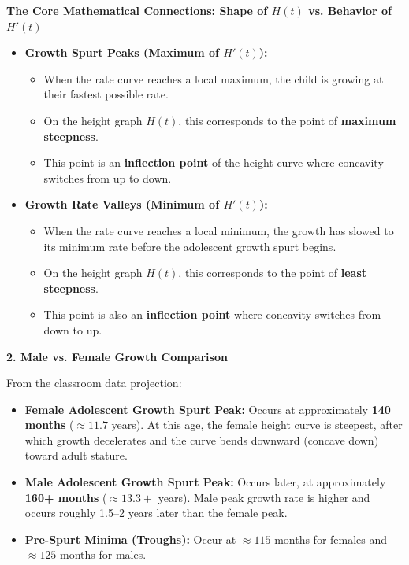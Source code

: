 \documentclass[10.5pt]{article}
\begin{document}
\begin{tcolorbox}[colback=boxbg, colframe=boxframe, boxrule=0.8pt, arc=3pt, left=8pt, right=8pt, top=4pt, bottom=4pt]
\textbf{\large The Core Mathematical Connections: Shape of $H(t)$ vs. Behavior of $H'(t)$}
\begin{itemize}[leftmargin=1.2em, topsep=2pt, itemsep=4pt]
  \item \textbf{Growth Spurt Peaks (Maximum of $H'(t)$):}
  \begin{itemize}[label=--]
    \item When the rate curve reaches a local maximum, the child is growing at their fastest possible rate.
    \item On the height graph $H(t)$, this corresponds to the point of \textbf{maximum steepness}.
    \item This point is an \textbf{inflection point} of the height curve where concavity switches from up to down.
  \end{itemize}
  \item \textbf{Growth Rate Valleys (Minimum of $H'(t)$):}
  \begin{itemize}[label=--]
    \item When the rate curve reaches a local minimum, the growth has slowed to its minimum rate before the adolescent growth spurt begins.
    \item On the height graph $H(t)$, this corresponds to the point of \textbf{least steepness}.
    \item This point is also an \textbf{inflection point} where concavity switches from down to up.
  \end{itemize}
\end{itemize}
\end{tcolorbox}

\vspace{0.04in}

\textbf{\large 2. Male vs. Female Growth Comparison}

From the classroom data projection:
\begin{itemize}[leftmargin=1.2em, topsep=1pt, itemsep=3pt]
  \item \textbf{Female Adolescent Growth Spurt Peak:}
    Occurs at approximately \textbf{140 months} ($\approx 11.7$ years). At this age, the female height curve is steepest, after which growth decelerates and the curve bends downward (concave down) toward adult stature.
  \item \textbf{Male Adolescent Growth Spurt Peak:}
    Occurs later, at approximately \textbf{160+ months} ($\approx 13.3+$ years). Male peak growth rate is higher and occurs roughly 1.5--2 years later than the female peak.
  \item \textbf{Pre-Spurt Minima (Troughs):}
    Occur at $\approx 115$ months for females and $\approx 125$ months for males.
\end{itemize}
\end{document}
